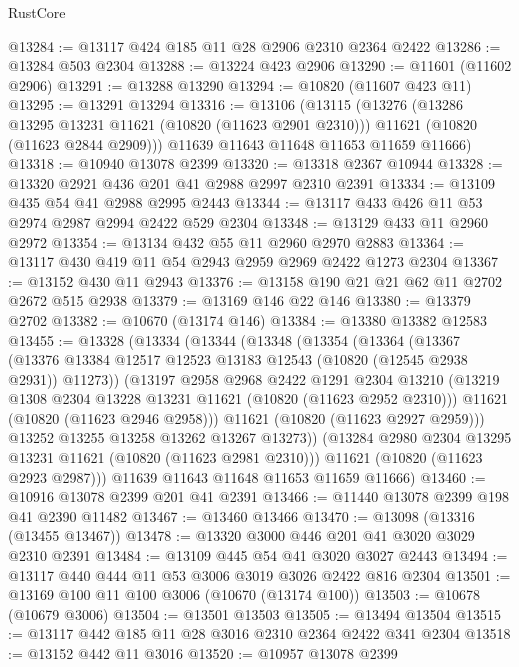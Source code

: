 \begin{lexlean}{RustCore}
\begin{coremodule}
@13284 := @13117 @424 @185 @11 @28 @2906 @2310 @2364 @2422
@13286 := @13284 @503 @2304
@13288 := @13224 @423 @2906
@13290 := @11601 (@11602 @2906)
@13291 := @13288 @13290
@13294 := @10820 (@11607 @423 @11)
@13295 := @13291 @13294
@13316 := @13106
    (@13115
      (@13276
        (@13286 @13295 @13231 @11621 (@10820 (@11623 @2901 @2310)))
        @11621
        (@10820 (@11623 @2844 @2909)))
      @11639
      @11643
      @11648
      @11653
      @11659
      @11666)
@13318 := @10940 @13078 @2399
@13320 := @13318 @2367 @10944
@13328 := @13320 @2921 @436 @201 @41 @2988 @2997 @2310 @2391
@13334 := @13109 @435 @54 @41 @2988 @2995 @2443
@13344 := @13117 @433 @426 @11 @53 @2974 @2987 @2994 @2422 @529 @2304
@13348 := @13129 @433 @11 @2960 @2972
@13354 := @13134 @432 @55 @11 @2960 @2970 @2883
@13364 := @13117 @430 @419 @11 @54 @2943 @2959 @2969 @2422 @1273 @2304
@13367 := @13152 @430 @11 @2943
@13376 := @13158 @190 @21 @21 @62 @11 @2702 @2672 @515 @2938
@13379 := @13169 @146 @22 @146
@13380 := @13379 @2702
@13382 := @10670 (@13174 @146)
@13384 := @13380 @13382 @12583
@13455 := @13328
    (@13334
      (@13344
        (@13348
          (@13354
            (@13364
              (@13367
                (@13376 @13384 @12517 @12523 @13183 @12543 (@10820 (@12545 @2938 @2931)) @11273))
              (@13197
                @2958
                @2968
                @2422
                @1291
                @2304
                @13210
                (@13219 @1308 @2304 @13228 @13231 @11621 (@10820 (@11623 @2952 @2310)))
                @11621
                (@10820 (@11623 @2946 @2958)))
              @11621
              (@10820 (@11623 @2927 @2959)))
            @13252
            @13255
            @13258
            @13262
            @13267
            @13273))
        (@13284 @2980 @2304 @13295 @13231 @11621 (@10820 (@11623 @2981 @2310)))
        @11621
        (@10820 (@11623 @2923 @2987)))
      @11639
      @11643
      @11648
      @11653
      @11659
      @11666)
@13460 := @10916 @13078 @2399 @201 @41 @2391
@13466 := @11440 @13078 @2399 @198 @41 @2390 @11482
@13467 := @13460 @13466
@13470 := @13098 (@13316 (@13455 @13467))
@13478 := @13320 @3000 @446 @201 @41 @3020 @3029 @2310 @2391
@13484 := @13109 @445 @54 @41 @3020 @3027 @2443
@13494 := @13117 @440 @444 @11 @53 @3006 @3019 @3026 @2422 @816 @2304
@13501 := @13169 @100 @11 @100 @3006 (@10670 (@13174 @100))
@13503 := @10678 (@10679 @3006)
@13504 := @13501 @13503
@13505 := @13494 @13504
@13515 := @13117 @442 @185 @11 @28 @3016 @2310 @2364 @2422 @341 @2304
@13518 := @13152 @442 @11 @3016
@13520 := @10957 @13078 @2399

\end{coremodule}
\end{lexlean}
